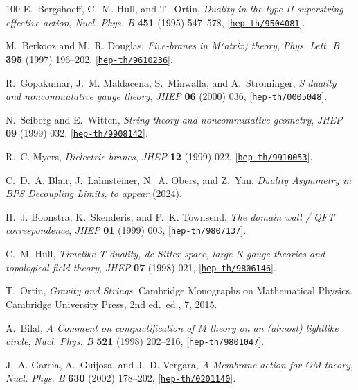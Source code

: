 \documentclass[11pt]{article}
\begin{document}
\begin{thebibliography}{100}
E.~Bergshoeff, C.~M. Hull, and T.~Ortin, {\it {Duality in the type II
  superstring effective action}},  {\em Nucl. Phys. B} {\bf 451} (1995)
  547--578, [\href{http://arxiv.org/abs/hep-th/9504081}{{\tt hep-th/9504081}}].

M.~Berkooz and M.~R. Douglas, {\it {Five-branes in M(atrix) theory}},  {\em
  Phys. Lett. B} {\bf 395} (1997) 196--202,
  [\href{http://arxiv.org/abs/hep-th/9610236}{{\tt hep-th/9610236}}].

R.~Gopakumar, J.~M. Maldacena, S.~Minwalla, and A.~Strominger, {\it {S duality
  and noncommutative gauge theory}},  {\em JHEP} {\bf 06} (2000) 036,
  [\href{http://arxiv.org/abs/hep-th/0005048}{{\tt hep-th/0005048}}].

N.~Seiberg and E.~Witten, {\it {String theory and noncommutative geometry}},
  {\em JHEP} {\bf 09} (1999) 032,
  [\href{http://arxiv.org/abs/hep-th/9908142}{{\tt hep-th/9908142}}].

R.~C. Myers, {\it {Dielectric branes}},  {\em JHEP} {\bf 12} (1999) 022,
  [\href{http://arxiv.org/abs/hep-th/9910053}{{\tt hep-th/9910053}}].

C.~D.~A. Blair, J.~Lahnsteiner, N.~A. Obers, and Z.~Yan, {\it {Duality
  Asymmetry in BPS Decoupling Limits}},  {\em to appear} (2024).

H.~J. Boonstra, K.~Skenderis, and P.~K. Townsend, {\it {The domain wall / QFT
  correspondence}},  {\em JHEP} {\bf 01} (1999) 003,
  [\href{http://arxiv.org/abs/hep-th/9807137}{{\tt hep-th/9807137}}].

C.~M. Hull, {\it {Timelike T duality, de Sitter space, large N gauge theories
  and topological field theory}},  {\em JHEP} {\bf 07} (1998) 021,
  [\href{http://arxiv.org/abs/hep-th/9806146}{{\tt hep-th/9806146}}].

T.~Ortin, {\em {Gravity and Strings}}.
\newblock Cambridge Monographs on Mathematical Physics. Cambridge University
  Press, 2nd ed.~ed., 7, 2015.

A.~Bilal, {\it {A Comment on compactification of M theory on an (almost)
  lightlike circle}},  {\em Nucl. Phys. B} {\bf 521} (1998) 202--216,
  [\href{http://arxiv.org/abs/hep-th/9801047}{{\tt hep-th/9801047}}].

J.~A. Garcia, A.~Guijosa, and J.~D. Vergara, {\it {A Membrane action for OM
  theory}},  {\em Nucl. Phys. B} {\bf 630} (2002) 178--202,
  [\href{http://arxiv.org/abs/hep-th/0201140}{{\tt hep-th/0201140}}].


\end{thebibliography}
\end{document}
